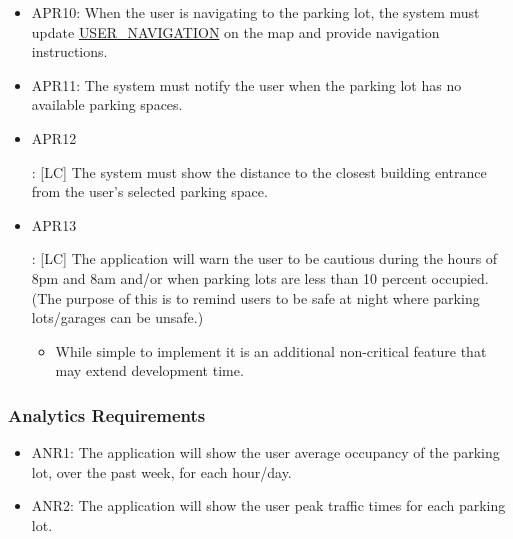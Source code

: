 \documentclass[]{article}
\begin{document}
\begin{itemize}
		\item APR10: When the user is navigating to the parking lot, the system must update
		\hyperlink{UNAV}{USER\_NAVIGATION}
		on the map and provide navigation instructions.
		
		\item APR11: The system must notify the user when the parking lot has no available parking spaces.
		
		\item \hypertarget{APR12}{APR12}: [LC] The system must show the distance to the closest building entrance from the user’s selected parking space.
		
		\item \hypertarget{APR13}{APR13}: [LC] The application will warn the user to be cautious during the hours of 8pm and 8am and/or when parking lots are less than 10 percent occupied. (The purpose of this is to remind users to be safe at night where parking lots/garages can be unsafe.)
		\begin{itemize}
			\item While simple to implement it is an additional non-critical feature that may extend development time.
		\end{itemize}
	\end{itemize}
\subsubsection{Analytics Requirements}
\begin{itemize}
	\item ANR1: The application will show the user average occupancy of the parking lot, over the past week, for each hour/day. 
	\item ANR2: The application will show the user peak traffic times for each parking lot.
\end{itemize}
\end{document}
